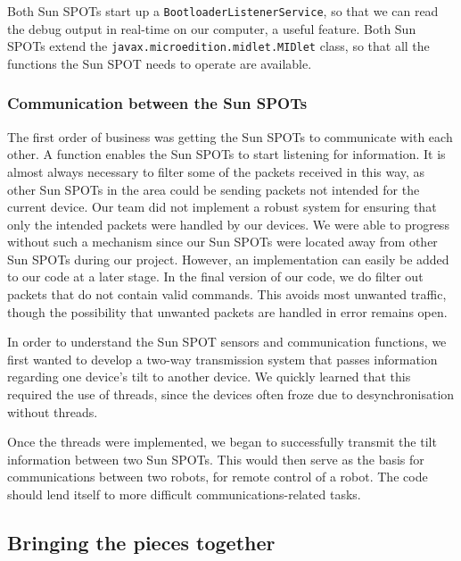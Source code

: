 \documentclass[a4paper,10pt]{article} %
\begin{document}
Both Sun SPOTs start up a \texttt{BootloaderListenerService}, so that we can
read the debug output in real-time on our computer, a useful feature. Both
Sun SPOTs extend the \texttt{javax.microedition.midlet.MIDlet} class, so that all
the functions the Sun SPOT needs to operate are available.

\subsubsection{Communication between the Sun SPOTs} %
\label{subsec:comm}

The first order of business was getting the Sun SPOTs to communicate with each
other. A function enables the Sun SPOTs to start listening for information. It
is almost always necessary to filter some of the packets received in this way,
as other Sun SPOTs in the area could be sending packets not intended for the
current device.  Our team did not implement a robust system for ensuring that
only the intended packets were handled by our devices. We were able to progress
without such a mechanism since our Sun SPOTs were located away from other Sun
SPOTs during our project. However, an implementation can easily be added to our
code at a later stage. In the final version of our code, we do filter out
packets that do not contain valid commands. This avoids most unwanted traffic,
though the possibility that unwanted packets are handled in error remains open.

In order to understand the Sun SPOT sensors and communication functions, we
first wanted to develop a two-way transmission system that passes information
regarding one device's tilt to another device. We quickly learned that this
required the use of threads, since the devices often froze due to
desynchronisation without threads.

Once the threads were implemented, we began to successfully transmit the tilt
information between two Sun SPOTs. This would then serve as the basis for
communications between two robots, for remote control of a robot. The code
should lend itself to more difficult communications-related tasks.



\subsection{Bringing the pieces together} %
\label{subsec:Bringing the pieces together}
\end{document}
